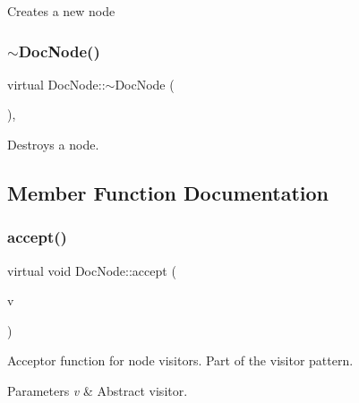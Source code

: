 Creates a new node \mbox{\label{class_doc_node_a024e5ba89b140e83416f9f85f5f6d036}} 
\subsubsection{\texorpdfstring{$\sim$DocNode()}{~DocNode()}}
{\footnotesize\ttfamily virtual Doc\+Node\+::$\sim$\+Doc\+Node (\begin{DoxyParamCaption}{ }\end{DoxyParamCaption})\hspace{0.3cm}{\ttfamily [inline]}, {\ttfamily [virtual]}}

Destroys a node. 

\subsection{Member Function Documentation}
\mbox{\label{class_doc_node_a5303a550cbe6395663bf9b9dad28cbf1}} 
\subsubsection{\texorpdfstring{accept()}{accept()}}
{\footnotesize\ttfamily virtual void Doc\+Node\+::accept (\begin{DoxyParamCaption}\item[{\mbox{\hyperlink{class_doc_visitor}{Doc\+Visitor}} $\ast$}]{v }\end{DoxyParamCaption})\hspace{0.3cm}{\ttfamily [pure virtual]}}

Acceptor function for node visitors. Part of the visitor pattern. 
\begin{DoxyParams}{Parameters}
{\em v} & Abstract visitor. \\
\hline
\end{DoxyParams}


